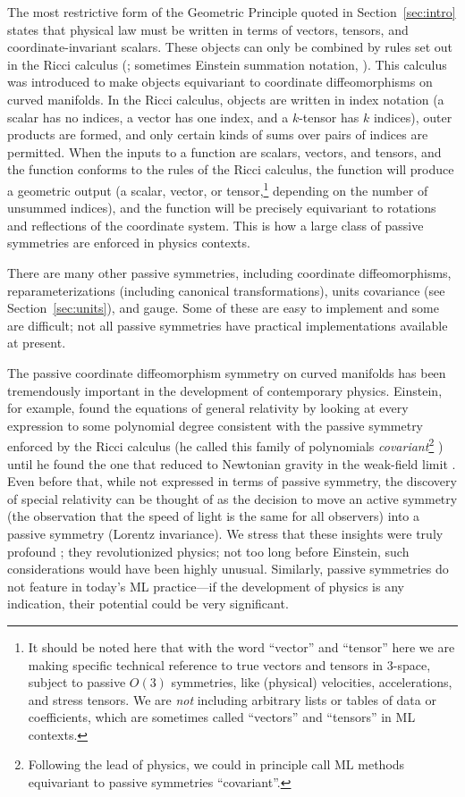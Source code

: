 \documentclass{article}
\theoremstyle{plain}
\theoremstyle{definition}
\theoremstyle{remark}
\newcommand{\sectionname}{Section}
\newcommand{\secref}[1]{\sectionname~\ref{#1}}
\begin{document}
The most restrictive form of the Geometric Principle quoted in \secref{sec:intro} states that physical law must be written in terms of vectors, tensors, and coordinate-invariant scalars.
These objects can only be combined by rules set out in the Ricci calculus (\citealt{ricci}; sometimes Einstein summation notation, \citealt{einstein}).
This calculus was introduced to make objects equivariant to coordinate diffeomorphisms on curved manifolds.
In the Ricci calculus, objects are written in index notation (a scalar has no indices, a vector has one index, and a $k$-tensor has $k$ indices), outer products are formed, and only certain kinds of sums over pairs of indices are permitted.
When the inputs to a function are scalars, vectors, and tensors, and the function conforms to the rules of the Ricci calculus, the function will produce a geometric output (a scalar, vector, or tensor,\footnote{%
It should be noted here that with the word ``vector'' and ``tensor'' here we are making specific technical reference to true vectors and tensors in 3-space, subject to passive $O(3)$ symmetries, like (physical) velocities, accelerations, and stress tensors.
We are \emph{not} including arbitrary lists or tables of data or coefficients, which are sometimes called ``vectors'' and ``tensors'' in ML contexts.}
depending on the number of unsummed indices), and the function will be precisely equivariant to rotations and reflections of the coordinate system.
This is how a large class of passive symmetries are enforced in physics contexts.

There are many other passive symmetries, including coordinate diffeomorphisms, reparameterizations (including canonical transformations), units covariance (see \secref{sec:units}), and gauge.
Some of these are easy to implement and some are difficult;
not all passive symmetries have practical implementations available at present.

The passive coordinate diffeomorphism symmetry on curved manifolds has been tremendously important in the development of contemporary physics.
Einstein, for example, found the equations of general relativity by looking at every expression to some polynomial degree consistent with the passive symmetry enforced by the Ricci calculus (he called this family of polynomials \emph{covariant}\footnote{Following the lead of physics, we could in principle call ML methods equivariant to passive symmetries ``covariant''.}
) until he found the one that reduced to Newtonian gravity in the weak-field limit \cite{gr}. Even before that, while not expressed in terms of passive symmetry, the discovery of special relativity \cite{sr} can be thought of as the decision to move an active symmetry (the observation that the speed of light is the same for all observers) into a passive symmetry (Lorentz invariance). We stress that these insights were truly profound \cite{EARMAN1978251}; they revolutionized physics; not too long before Einstein, such considerations would have been highly unusual. 
Similarly, passive symmetries do not feature in today's ML practice---if the development of physics is any indication, their potential could be very significant.
\end{document}
